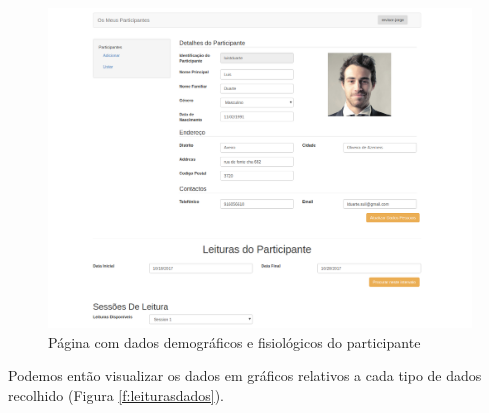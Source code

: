 \begin{figure}[H]
\centering
\includegraphics[width=1\textwidth]{imgs/user-info-web.png}
\caption[Página com dados demográficos e fisiológicos do participante]{Página com dados demográficos e fisiológicos do participante}
\label{f:webleiturassessoes}
\end{figure}

Podemos então visualizar os dados em gráficos relativos a cada tipo de dados recolhido (Figura \ref{f:leiturasdados}). 

